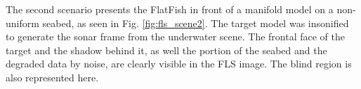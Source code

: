 \documentclass[final,5p,times]{elsarticle}
\begin{document}
The second scenario presents the FlatFish in front of a manifold model on a non-uniform seabed, as seen in Fig. \ref{fig:fls_scene2}. The target model was insonified to generate the sonar frame from the underwater scene. The frontal face of the target and the shadow behind it, as well the portion of the seabed and the degraded data by noise, are clearly visible in the FLS image. The blind region is also represented here.

\begin{figure}[ht]
    \centering
\end{figure}
\end{document}
